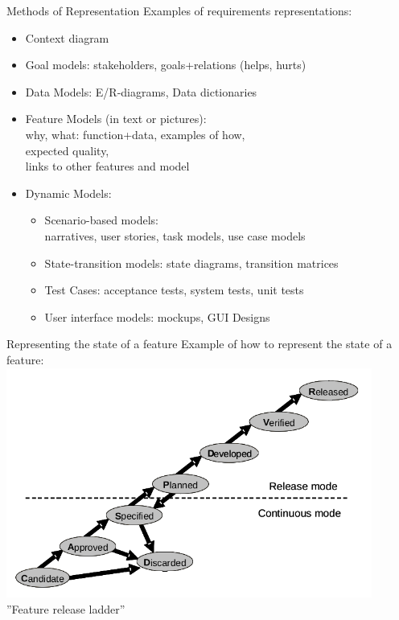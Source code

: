\documentclass{beamer}
\begin{document}
\begin{frame}[fragile]{Methods of Representation}
Examples of requirements representations:
\begin{itemize}
\item Context diagram
\item Goal models: stakeholders, goals+relations (helps, hurts)
\item Data Models: E/R-diagrams, Data dictionaries
\item Feature Models (in text or pictures):\\why, what: function+data, examples of how,\\expected quality,\\links to other features and model
\item Dynamic Models: 
\begin{itemize}
\item Scenario-based models:\\narratives, user stories, task models, use case models
\item State-transition models: state diagrams, transition matrices
\item Test Cases: acceptance tests, system tests, unit tests
\item User interface models: mockups, GUI Designs
\end{itemize}
\end{itemize}
\end{frame}

\begin{frame}[fragile]{Representing the state of a feature}
Example of how to represent the state of a feature:
\includegraphics[width=0.9\textwidth]{img/ladder}
''Feature release ladder''
\end{frame}



    
\end{document}
